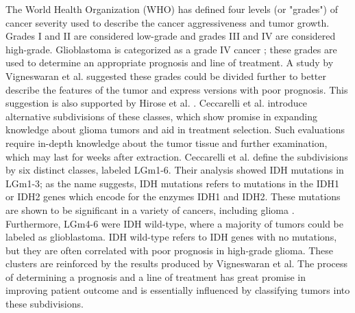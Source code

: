 The World Health Organization (WHO) has defined four levels (or "grades") of cancer severity used to describe the cancer aggressiveness and tumor growth. Grades I and II are considered low-grade and grades III and IV are considered high-grade. Glioblastoma is categorized as a grade IV cancer \cite{bleeker2012recent, gradesandpriorsubdivision}; these grades are used to determine an appropriate prognosis and line of treatment. A study by Vigneswaran et al. \cite{gradesandpriorsubdivision} suggested these grades could be divided further to better describe the features of the tumor and express versions with poor prognosis. This suggestion is also supported by Hirose et al. \cite{hirose2013subgrouping}. Ceccarelli et al. \cite{cellsubsets} introduce alternative subdivisions of these classes, which show promise in expanding knowledge about glioma tumors and aid in treatment selection. Such evaluations require in-depth knowledge about the tumor tissue and further examination, which may last for weeks after extraction. Ceccarelli et al. define the subdivisions by six distinct classes, labeled LGm1-6. Their analysis showed IDH mutations in LGm1-3; as the name suggests, IDH mutations refers to mutations in the IDH1 or IDH2 genes which encode for the enzymes IDH1 and IDH2. These mutations are shown to be significant in a variety of cancers, including glioma \cite{dang2016idh}. Furthermore, LGm4-6 were IDH wild-type, where a majority of tumors could be labeled as glioblastoma. IDH wild-type refers to IDH genes with no mutations, but they are often correlated with poor prognosis in high-grade glioma. These clusters are reinforced by the results produced by Vigneswaran et al. The process of determining a prognosis and a line of treatment has great promise in improving patient outcome and is essentially influenced by classifying tumors into these subdivisions.

